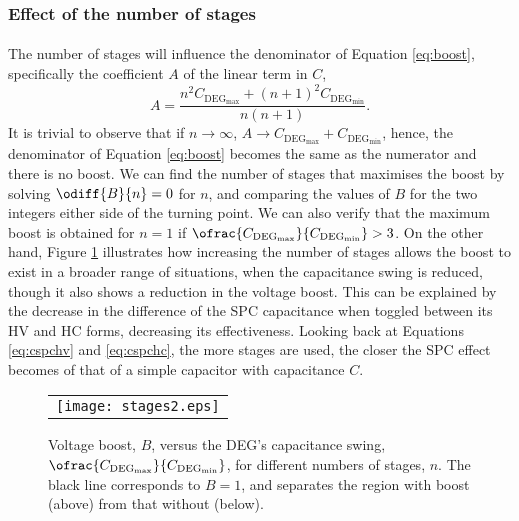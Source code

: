 \subsubsection{Effect of the number of stages}

\paragraph{} The number of stages will influence the denominator of Equation \ref{eq:boost}, specifically the coefficient $A$ of the linear term in $C$,
\begin{equation}
A = \frac{n^{2}C_{\text{DEG}_{\max}}+(n+1)^{2}C_{\text{DEG}_{\min}}}{n(n+1)}.
\end{equation}
It is trivial to observe that if $n\rightarrow\infty$, $A\rightarrow C_{\text{DEG}_{\max}}+C_{\text{DEG}_{\min}}$, hence,  the denominator  of Equation \ref{eq:boost} becomes the same as the numerator and there is no boost.
We can find the number of stages that maximises the boost by solving $\odiff{B}{n}=0$ for $n$, and comparing the values of $B$ for the two integers either side of the turning point.
We can also verify that the maximum boost is obtained for $n=1$ if $\ofrac{C_{\text{DEG}_\text{max}}}{C_{\text{DEG}_\text{min}}}>3$. On the other hand, Figure \ref{fig:nvariation} illustrates how increasing the number of stages allows the boost to exist in a broader range of situations, when the capacitance swing is reduced, though it also shows a reduction in the voltage boost. This can be explained by the decrease in the difference of the SPC capacitance when toggled between its HV and HC forms, decreasing its effectiveness. Looking back at Equations \ref{eq:cspchv} and \ref{eq:cspchc}, the more stages are used, the closer the SPC effect becomes of that of a simple capacitor with capacitance $C$.

\begin{figure}[ht]
\begin{center}
\begin{tabular}{c}
\texttt{[image: stages2.eps]}\\
\end{tabular}
\end{center}
\caption 
{ \label{fig:nvariation}
Voltage boost, $B$, versus the DEG's capacitance swing, $\ofrac{C_{\text{DEG}_\text{max}}}{C_{\text{DEG}_\text{min}}}$, for different numbers of stages, $n$. The black line corresponds to $B=1$, and separates the region with boost (above) from that without (below).} 
\end{figure}

